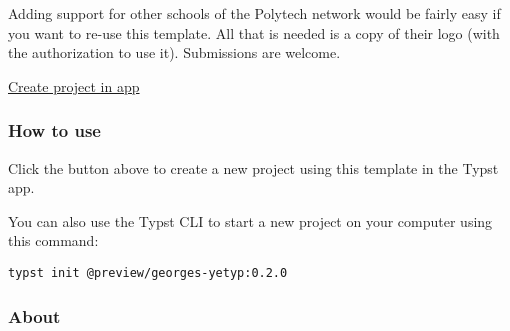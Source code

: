 Adding support for other schools of the Polytech network would be fairly
easy if you want to re-use this template. All that is needed is a copy
of their logo (with the authorization to use it). Submissions are
welcome.

\href{/app?template=georges-yetyp&version=0.2.0}{Create project in app}

\subsubsection{How to use}\label{how-to-use}

Click the button above to create a new project using this template in
the Typst app.

You can also use the Typst CLI to start a new project on your computer
using this command:

\begin{verbatim}
typst init @preview/georges-yetyp:0.2.0
\end{verbatim}



\subsubsection{About}\label{about}

